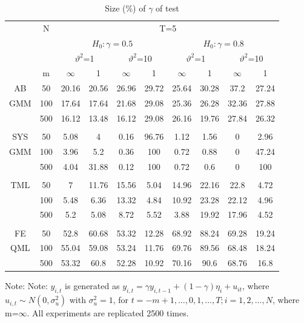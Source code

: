 \documentclass[12pt,a4paper,hyperref]{article}
\begin{document}
\begin{center}
\begin{table}[H]
\caption{Size (\%) of $\gamma$ of test} \label{table9}
\centering
\begin{tabular} {*{10}{c}}
\toprule
&N& \multicolumn{8}{c}{T=5}\\
\cmidrule(lr){3-10}
&& \multicolumn{4}{c}{$H_{0}: \gamma=0.5$} & \multicolumn{4}{c}{$H_{0}: \gamma=0.8$}\\
  \cmidrule(lr){3-6} \cmidrule(lr){7-10}
&&  \multicolumn{2}{c}{$\vartheta^{2}$=1}&\multicolumn{2}{c}{$\vartheta^{2}$=10} & \multicolumn{2}{c}{$\vartheta^{2}$=1}&\multicolumn{2}{c}{$\vartheta^{2}$=10}\\
\cmidrule(lr){3-4} \cmidrule(lr){5-6}\cmidrule(lr){7-8}\cmidrule(lr){9-10}
& m & $\infty$ &1&$\infty$ &1&$\infty$ &1&$\infty$&1\\
\cmidrule(lr){3-4} \cmidrule(lr){5-6}\cmidrule(lr){7-8}\cmidrule(lr){9-10}
AB&50 & 20.16&	20.56	&26.96	&29.72	&25.64	&30.28	&37.2&	27.24\\
GMM&100&17.64	&17.64	&21.68&	29.08	&25.36	&26.28	&32.36	&27.88\\ 
 &500& 16.12&	13.48&	16.12&	29.08	&26.16	&19.76&	27.84	&26.32\\
\midrule \\
\cmidrule(lr){3-4} \cmidrule(lr){5-6}\cmidrule(lr){7-8}\cmidrule(lr){9-10}
SYS&50 &5.08	&4	&0.16	&96.76&	1.12	&1.56&	0	&2.96 \\
 GMM&100& 3.96&	5.2	&0.36&	100&	0.72&	0.88	&0	&47.24\\  
 &500 &4.04&	31.88&	0.12	&100&	0.72&	0.6	&0&	100\\
\midrule \\
\cmidrule(lr){3-4} \cmidrule(lr){5-6}\cmidrule(lr){7-8}\cmidrule(lr){9-10}
TML &50 &	7	&11.76&	15.56&	5.04&	14.96	&22.16	&22.8&	4.72 \\
&100&5.48	&6.36&	13.32&	4.84	&10.92&	23.28&	22.12	&4.96\\
 &500 & 5.2	&5.08	&8.72&	5.52	&3.88	&19.92&	17.96&	4.52 \\
 \midrule \\
\cmidrule(lr){3-4} \cmidrule(lr){5-6}\cmidrule(lr){7-8}\cmidrule(lr){9-10}
FE& 50 &52.8&60.68&	53.32&12.28&68.92&	88.24&	69.28&	19.24\\
 QML&100 &55.04&59.08&53.24&11.76&69.76&89.56&68.48	&18.24\\ 	
 &500 &53.32&60.8&52.28	&10.92&	70.16&90.6&	68.76&	16.8\\  
\bottomrule
\end{tabular}
\begin{tablenotes}
      \small
      \item Note: Note: $y_{i,t}$ is generated as $y_{i,t}=\gamma y_{i,t-1}+(1-\gamma)\eta_{i}+u_{it}$, where $u_{i,t} \sim N\left(0, \sigma^{2}_{u} \right)$ with $\sigma^{2}_{u}=1$, for $t=-m+1,\ldots , 0, 1,\ldots, T; i=1,2,\ldots ,N$, where m=$\infty$.   All experiments are replicated 2500 times.
    \end{tablenotes}
\end{table}
\end{center}
\end{document}
